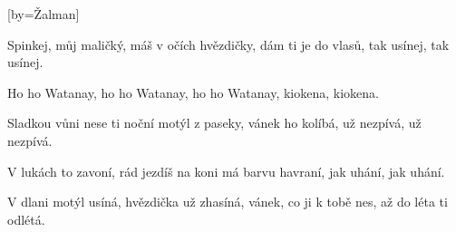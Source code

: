 [by={Žalman}]

\beginverse{}
Spinkej, můj maličký, máš v očích hvězdičky,
dám ti je do vlasů, tak usínej, tak usínej.
\endverse{}

\beginchorus{}
Ho ho Watanay, ho ho Watanay,
ho ho Watanay, kiokena, kiokena.
\endchorus{}

\beginverse{}
Sladkou vůni nese ti noční motýl z paseky,
vánek ho kolíbá, už nezpívá, už nezpívá.
\endverse{}

\beginchorus{}
\phantom{}
\endchorus{}

\beginverse{}
V lukách to zavoní, rád jezdíš na koni
má barvu havraní, jak uhání, jak uhání.
\endverse{}

\beginchorus{}
\phantom{}
\endchorus{}

\beginverse{}
V dlani motýl usíná, hvězdička už zhasíná,
vánek, co ji k tobě nes, až do léta ti odlétá.
\endverse{}

\beginchorus{}
\phantom{}
\endchorus{}

\endsong{}
